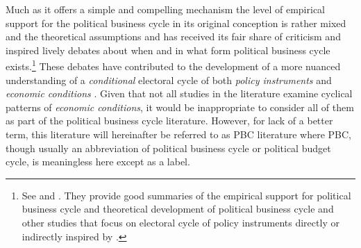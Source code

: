 \documentclass{article}
\begin{document}
		Much as
		it offers a simple and compelling mechanism
		the level of empirical support for the
		political business cycle in its original conception
		is rather mixed and
		the theoretical assumptions
		and
		has received its fair share of criticism
		and inspired lively debates about
		when and in what form political business cycle exists.\footnote{
			See \citeauthor{duboisPoliticalBusinessCycles2016}
			\autocite*{duboisPoliticalBusinessCycles2016}
			and
			\citeauthor{altContextConditionalPolitical2009}
			\autocite*{altContextConditionalPolitical2009}.
			They provide good summaries
			of the empirical support for political business cycle
			and theoretical development of
			political business cycle and other
			studies that focus on electoral cycle of policy instruments
			directly or indirectly inspired by
			\citeauthor{nordhausPoliticalBusinessCycle1975}
			\autocite*{nordhausPoliticalBusinessCycle1975}.
		}
		These debates
		have contributed to the development of
		a more nuanced
		understanding of a \textit{conditional} electoral cycle
		of both \textit{policy instruments}
		and \textit{economic conditions}
		\autocite{altContextConditionalPolitical2009}.
		Given that not all studies in the literature
		examine cyclical patterns of \textit{economic conditions},
		it would be inappropriate to consider all of them as
		part of the political business cycle literature.
		However, for lack of a better term,
		this literature will hereinafter be referred to as PBC literature
		where PBC, though usually an abbreviation of political business cycle
		or political budget cycle,
		is meaningless here except as a label.
		
		
		
		
		
\end{document}
